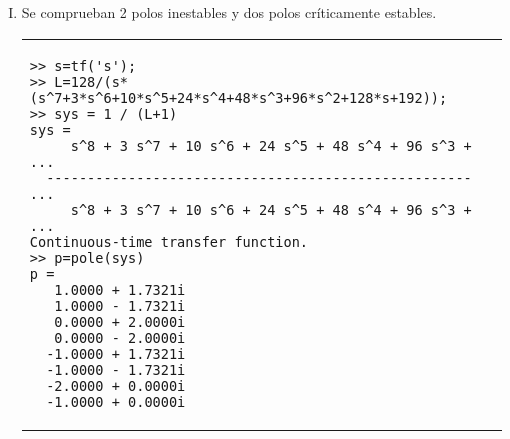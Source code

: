 \begin{ejercicio}
\begin{enumerate}
\begin{enumerate}[I.]
      \item
      Se comprueban 2 polos inestables y dos polos críticamente estables.
      \begin{center}
        \begin{tabular}{p{}}
        \toprule
          \begin{verbatim}
>> s=tf('s');
>> L=128/(s*(s^7+3*s^6+10*s^5+24*s^4+48*s^3+96*s^2+128*s+192));
>> sys = 1 / (L+1)
sys =
     s^8 + 3 s^7 + 10 s^6 + 24 s^5 + 48 s^4 + 96 s^3 + ...
  ---------------------------------------------------- ...
     s^8 + 3 s^7 + 10 s^6 + 24 s^5 + 48 s^4 + 96 s^3 + ...
Continuous-time transfer function.
>> p=pole(sys)
p =
   1.0000 + 1.7321i
   1.0000 - 1.7321i
   0.0000 + 2.0000i
   0.0000 - 2.0000i
  -1.0000 + 1.7321i
  -1.0000 - 1.7321i
  -2.0000 + 0.0000i
  -1.0000 + 0.0000i
          \end{verbatim}
        \bottomrule
      \end{tabular}
      \end{center}
      
    \end{enumerate}

  \end{enumerate}
\end{ejercicio}